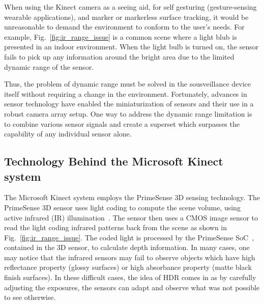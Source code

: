 When using the Kinect camera as a seeing aid, for self gesturing (gesture-sensing wearable applications), and marker or markerless surface tracking, it would be unreasonable to demand the environment to conform to the user's needs. For example, Fig.~\ref{fig:ir_range_issue} is a common scene where a light blub is presented in an indoor environment. When the light bulb is turned on, the sensor fails to pick up any information around the bright area due to the limited dynamic range of the sensor. 

Thus, the problem of dynamic range must be solved in the sousveillance device itself without requiring a  change in the environment. Fortunately, advances in sensor technology have enabled the miniaturization of sensors and their use in a robust camera array setup. One way to address the dynamic range limitation is to combine various sensor signals and create a superset which surpasses the capability of any individual sensor alone.

\subsection{Technology Behind the Microsoft Kinect system}
The Microsoft Kinect system employs the PrimeSense 3D sensing technology. The PrimeSense 3D sensor uses light coding to compute the scene volume, using active infrared (IR) illumination~\cite{shpunt2008depth,shpunt2010optical,shpunt2007depth}. The sensor then uses a CMOS image sensor to read the light coding infrared patterns back from the scene as shown in Fig.~\ref{fig:ir_range_issue}. The coded light is processed by the PrimeSense SoC~\cite{spektor2009integrated}, contained in the 3D sensor, to calculate depth information. In many cases, one may notice that the infrared sensors may fail to observe objects which have high reflectance property (glossy surfaces) or high absorbance property (matte black finish surfaces). In these difficult cases, the idea of HDR comes in as by carefully adjusting the exposures, the sensors can adapt and observe what was not possible to see otherwise.

